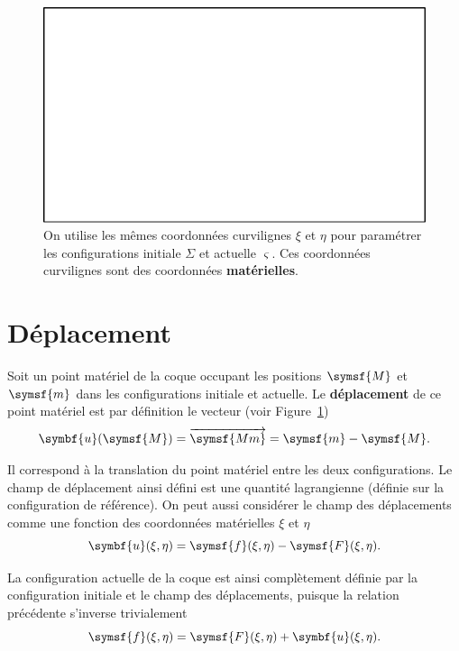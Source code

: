 \documentclass[
  a4paper,
  DIV=11,
  numbers=noendperiod]{scrreprt}
\newcommand{\altvec}[1]{\overrightarrow{#1}}
\newcommand{\point}[1]{\symsf{#1}}
\renewcommand{\vec}[1]{\symbf{#1}}
\begin{document}
\begin{figure}

{\centering \includegraphics{./croquis/blanc.pdf}

}

\caption{\label{fig-20230302053622}On utilise les mêmes coordonnées
curvilignes \(\xi\) et \(\eta\) pour paramétrer les configurations
initiale \(\Sigma\) et actuelle \(\varsigma\). Ces coordonnées
curvilignes sont des coordonnées \textbf{matérielles}.}

\end{figure}

\hypertarget{duxe9placement}{%
\section{Déplacement}\label{duxe9placement}}

Soit un point matériel de la coque occupant les positions \(\point{M}\)
et \(\point{m}\) dans les configurations initiale et actuelle. Le
\textbf{déplacement} de ce point matériel est par définition le vecteur
(voir Figure~\ref{fig-20230302053622}) \[
\vec{u}(\point{M}) = \altvec{\point{Mm}} = \point{m} - \point{M}.
\]

Il correspond à la translation du point matériel entre les deux
configurations. Le champ de déplacement ainsi défini est une quantité
lagrangienne (définie sur la configuration de référence). On peut aussi
considérer le champ des déplacements comme une fonction des coordonnées
matérielles \(\xi\) et \(\eta\) \[
\vec{u}(\xi, \eta) = \point{f}(\xi, \eta) - \point{F}(\xi, \eta).
\]

La configuration actuelle de la coque est ainsi complètement définie par
la configuration initiale et le champ des déplacements, puisque la
relation précédente s'inverse trivialement \[
\point{f}(\xi, \eta) = \point{F}(\xi, \eta) + \vec{u}(\xi, \eta).
\]
\end{document}
